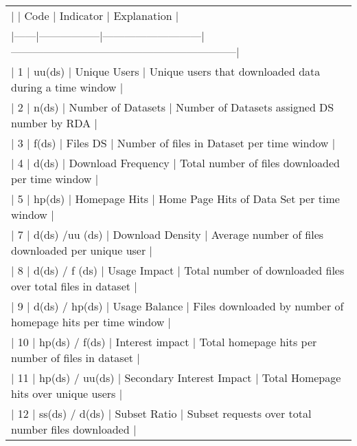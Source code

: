 \begin{table}[h]
\begin{tabular}{l}
| | Code      | Indicator             | Explanation                                                             |     \\
|------|-----------------|---------------------------|--------------------------------------------------------------| \\
| 1    | uu(ds)          | Unique Users              | Unique users that downloaded data during a time window       | \\
| 2    | n(ds)           | Number of Datasets        | Number of Datasets assigned DS number by RDA                 | \\
| 3    | f(ds)           | Files DS                  | Number of files in Dataset per time window                   | \\
| 4    | d(ds)           | Download Frequency        | Total number of files downloaded per time window             | \\
| 5    | hp(ds)          | Homepage Hits             | Home Page Hits of Data Set per time window                   | \\
| 7    | d(ds) /uu (ds)  | Download Density          | Average number of files downloaded per unique user           | \\
| 8    | d(ds) / f (ds)  | Usage Impact              | Total number of downloaded files over total files in dataset | \\
| 9    | d(ds) / hp(ds)  | Usage Balance             | Files downloaded by number of homepage hits per time window  | \\
| 10   | hp(ds) / f(ds)  | Interest impact           | Total homepage hits per number of files in dataset           | \\
| 11   | hp(ds) / uu(ds) | Secondary Interest Impact | Total Homepage hits over unique users                        | \\
| 12   | ss(ds) / d(ds)  | Subset Ratio              | Subset requests over total number files downloaded           |
\end{tabular}
\end{table}